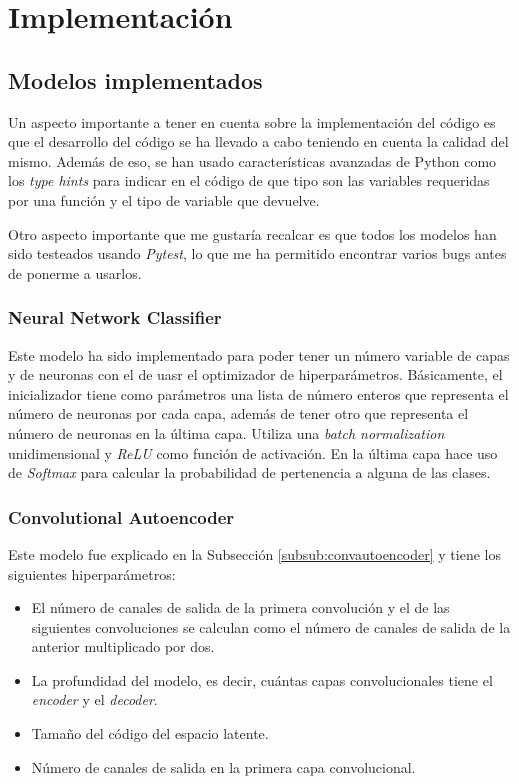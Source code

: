 \chapter{Implementación}

\section{Modelos implementados}

Un aspecto importante a tener en cuenta sobre la implementación del código es que el desarrollo del código se ha llevado a cabo teniendo en cuenta la calidad del mismo. Además de eso, se han usado características avanzadas de Python como los \textit{type hints} para indicar en el código de que tipo son las variables requeridas por una función y el tipo de variable que devuelve.\newline

Otro aspecto importante que me gustaría recalcar es que todos los modelos han sido testeados usando \textit{Pytest}, lo que me ha permitido encontrar varios bugs antes de ponerme a usarlos.\\

\subsection{Neural Network Classifier}

Este modelo ha sido implementado para poder tener un número variable de capas y de neuronas con el de uasr el optimizador de hiperparámetros. Básicamente, el inicializador tiene como parámetros una lista de número enteros que representa el número de neuronas por cada capa, además de tener otro que representa el número de neuronas en la última capa. Utiliza una \textit{batch normalization} unidimensional y \textit{ReLU} como función de activación. En la última capa hace uso de \textit{Softmax} para calcular la probabilidad de pertenencia a alguna de las clases.\\

\subsection{Convolutional Autoencoder}\label{subsec:cae}

Este modelo fue explicado en la Subsección \ref{subsub:convautoencoder} y tiene los siguientes hiperparámetros:

\begin{itemize}
	\item El número de canales de salida de la primera convolución y el de las siguientes convoluciones se calculan como el número de canales de salida de la anterior multiplicado por dos.
	\item La profundidad del modelo, es decir, cuántas capas convolucionales tiene el \textit{encoder} y el \textit{decoder}.
	\item Tamaño del código del espacio latente.
	\item Número de canales de salida en la primera capa convolucional.
\end{itemize}

